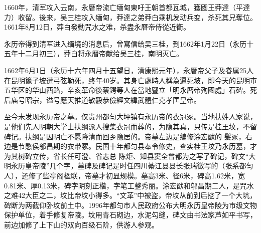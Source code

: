 1660年，清军攻入云南，永曆帝流亡缅甸東吁王朝首都瓦城，獲國王莽達（平達力）收留。後来，吴三桂攻入缅甸，莽達之弟莽白乘机发动兵变，杀死其兄奪位。1661年8月12日，莽白發動咒水之难，杀盡永曆帝侍從近衛。

永历帝得到清军进入缅境的消息后，曾寫信给吴三桂，到1662年1月22日（永历十五年十二月初三），莽白将永曆帝献给吴三桂，南明灭亡。

1662年6月1日（永历十六年四月十五望日，清康熙元年），永曆帝父子及眷属25人在昆明篦子坡遭弓弦勒死，终年40岁。其身亡處時人稱為逼死坡，即今天的昆明市五华区的华山西路，辛亥革命後蔡鍔等人在當地豎立「明永曆帝殉國處」石碑。死后庙号昭宗，谥号應天推道敏毅恭儉經文緯武體仁克孝匡皇帝。

至今未发现永历帝之墓。仅贵州都匀大坪镇有永历帝的衣冠冢。当地扶姓人家说，是他们先人明朝大学士扶纲派人搜集衣冠而葬的，为隐其真，只传是桂王坟，不留碑记。扶纲是因明亡不愿降清而回乡隐居的。帝墓左边是编修涂宏猷的 髮冢，右边是节愍侯邬昌期的衣带冢。民国十年都匀县奉令修史，查实桂王坟乃永历墓，才为其树碑立传，省长任可澄、省志总 陈炬、知县窦全曾都为之写了碑记，碑文“大明永历皇帝陵”几个字，墓碑及碑记是时任四川綦江县县长张瑞徵写的（张系都匀人），还修了些亭阁楹联，帝墓才初显规模。墓高3米、径6米，碑高1.62米，宽0.81米、厚0.13米，碑字阴刻正楷，字笔工整秀丽。涂宏猷和邬昌期二人，是咒水之难42大臣之二，坟比帝坟小得多。“文革”中被盗，帝坟从前到后挖了一个大坑，碑断为两截仰卧坟前土中。1996年都匀市人民政府公布大明永历皇帝陵为市级文物保护单位，着手修复帝陵。坟用青石砌边，水泥勾缝，碑文由书法家芦如平书写，前边加修了上下山的双向百级石阶，供游人参观。

